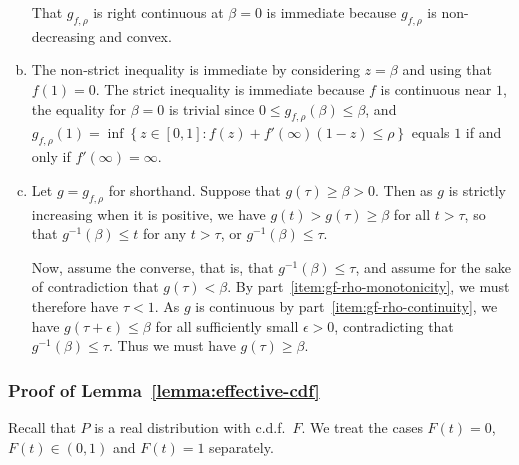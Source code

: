 \begin{enumerate}[(a)]
  That $g_{f,\rho}$ is right continuous at $\beta = 0$ is immediate
  because $g_{f,\rho}$ is non-decreasing and convex.

\item
  The non-strict inequality is immediate by considering $z = \beta$ and
  using that $f(1) = 0$. The strict inequality is immediate
  because $f$ is continuous near $1$,  the equality for $\beta=0$ is trivial since $0 \le g_{f,\rho}(\beta) \le \beta$, and $g_{f,\rho}(1) = \inf \left\{ z\in [0,1]: f(z) + f'(\infty)(1-z) \le \rho \right\}$ equals $1$ if and only if $f'(\infty) = \infty$.
  
\item
  Let $g = g_{f,\rho}$ for shorthand.
  Suppose that $g(\tau) \ge \beta > 0$. Then
  as $g$ is strictly increasing when it is positive, we have
  $g(t) > g(\tau) \ge \beta$ for all $t > \tau$, so that
  $g^{-1}(\beta) \le t$ for any $t > \tau$, or $g^{-1}(\beta) \le \tau$.

  Now, assume the converse, that is, that $g^{-1}(\beta) \le \tau$, and
  assume for the sake of contradiction that $g(\tau) < \beta$.  By
  part~\eqref{item:gf-rho-monotonicity}, we must therefore have $\tau < 1$.
  As $g$ is continuous by part~\eqref{item:gf-rho-continuity}, we have
  $g(\tau + \epsilon) \le \beta$ for all sufficiently small $\epsilon > 0$,
  contradicting that $g^{-1}(\beta) \le \tau$.  Thus we must have $g(\tau)
  \ge \beta$.
\end{enumerate}

\subsubsection{Proof of Lemma~\ref{lemma:effective-cdf}}
\label{sec:proof-effective-cdf}

Recall that $P$ is a real distribution with c.d.f.\ $F$.  
We treat the cases $F(t) = 0$, $F(t) \in (0,1)$ and $F(t) = 1$ separately.

